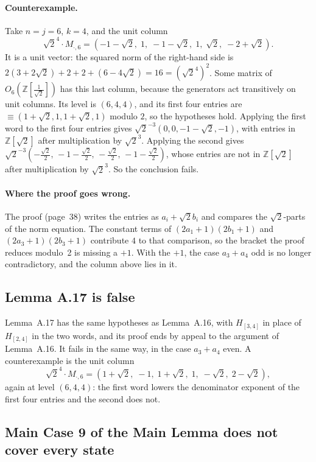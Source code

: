\documentclass[11pt]{article}
\newcommand{\Z}{\mathbb{Z}}
\begin{document}
\paragraph{Counterexample.} Take $n=j=6$, $k=4$, and the unit column
\[
\sqrt2^4\cdot M_{\cdot,6} = (-1-\sqrt2,\; 1,\; -1-\sqrt2,\; 1,\; \sqrt2,\; -2+\sqrt2).
\]
It is a unit vector: the squared norm of the right-hand side is
$2(3+2\sqrt2) + 2 + 2 + (6-4\sqrt2) = 16 = (\sqrt2^4)^2$. Some matrix
of $O_6(\Z[\frac1{\sqrt2}])$ has this last column, because the
generators act transitively on unit columns. Its level is $(6,4,4)$,
and its first four entries are $\equiv(1+\sqrt2,1,1+\sqrt2,1)$ modulo
$2$, so the hypotheses hold. Applying the first word to the first four
entries gives $\sqrt2^{-3}(0,0,-1-\sqrt2,-1)$, with entries in
$\Z[\sqrt2]$ after multiplication by $\sqrt2^{3}$. Applying the second
gives
$\sqrt2^{-3}(-\tfrac{\sqrt2}{2},\,-1-\tfrac{\sqrt2}{2},\,-\tfrac{\sqrt2}{2},\,-1-\tfrac{\sqrt2}{2})$,
whose entries are not in $\Z[\sqrt2]$ after multiplication by
$\sqrt2^{3}$. So the conclusion fails.

\paragraph{Where the proof goes wrong.} The proof (page~38) writes
the entries as $a_i+\sqrt2 b_i$ and compares the $\sqrt2$-parts of the
norm equation. The constant terms of $(2a_1+1)(2b_1+1)$ and
$(2a_3+1)(2b_3+1)$ contribute $4$ to that comparison, so the bracket
the proof reduces modulo~2 is missing a $+1$. With the $+1$, the case
$a_3+a_4$ odd is no longer contradictory, and the column above lies
in it.

\subsection{Lemma A.17 is false}

Lemma~A.17 has the same hypotheses as Lemma~A.16, with $H_{[3,4]}$ in
place of $H_{[2,4]}$ in the two words, and its proof ends by appeal to
the argument of Lemma~A.16. It fails in the same way, in the case
$a_3+a_4$ even. A counterexample is the unit column
\[
\sqrt2^4\cdot M_{\cdot,6} = (1+\sqrt2,\; -1,\; 1+\sqrt2,\; 1,\; -\sqrt2,\; 2-\sqrt2),
\]
again at level $(6,4,4)$: the first word lowers the denominator
exponent of the first four entries and the second does not.

\subsection{Main Case 9 of the Main Lemma does not cover every state}
\end{document}
